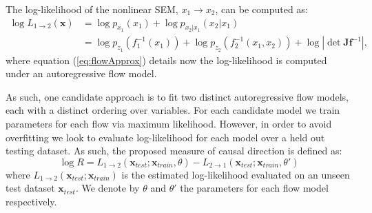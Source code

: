 \documentclass[]{article}
\begin{document}
The log-likelihood of the nonlinear SEM, $x_1 \rightarrow x_2$, can be computed as:
\begin{align}
\log L_{1\rightarrow 2 } ( \mathbf{x} ) &= \log p_{x_1}(x_1) + \log p_{x_2|x_1}( x_2 | x_1) \\
&= \log p_{z_1} ( f_1^{-1} (x_1)) + \log p_{z_2} (f_2^{-1}( x_1, x_2)) + \log | \det \mathbf{J} \mathbf{f}^{-1}|, 
\label{eq:flowApprox}
\end{align}
where equation (\ref{eq:flowApprox}) details now the log-likelihood is computed under an autoregressive flow model. 

As such, one candidate approach is to fit two distinct
autoregressive flow models, each with a distinct ordering over variables. 
For each candidate model we train parameters for each flow via maximum likelihood. 
However, in order to avoid overfitting we look to evaluate log-likelihood for each model over a 
held out testing dataset. As such, the proposed measure of causal direction is 
defined as:
\begin{equation}
\log R = {L_{1\rightarrow 2 }(\mathbf{x}_{test}; \mathbf{x}_{train}, \theta) } - { L_{2\rightarrow 1 }(\mathbf{x}_{test}; \mathbf{x}_{train}, \theta') }
\label{eq:flowLR}
\end{equation}
where $L_{1\rightarrow 2 }(\mathbf{x}_{test}; \mathbf{x}_{train}) $ is the estimated log-likelihood 
evaluated on an unseen test dataset $\mathbf{x}_{test}$. %
We denote by $\theta$ and $\theta'$ the parameters 
for each flow model respectively. 


\newpage 



\end{document}
